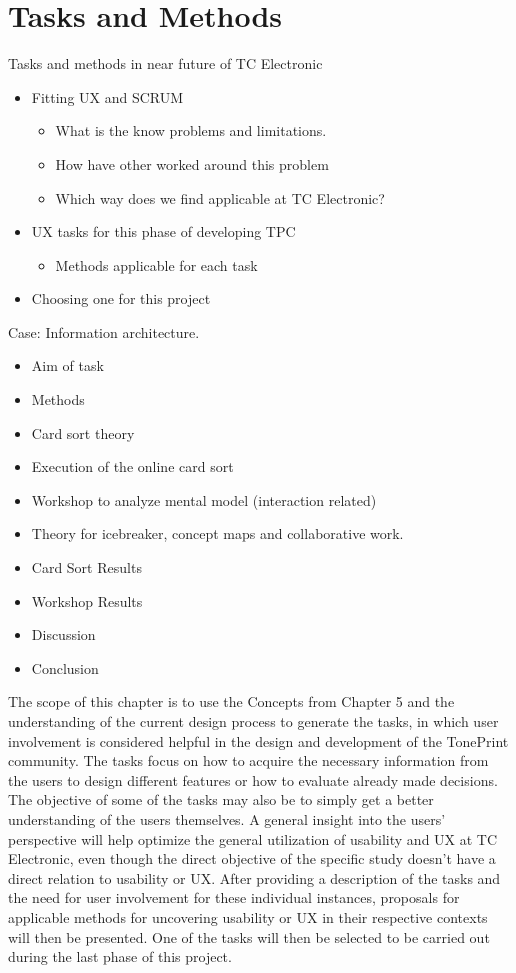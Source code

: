 \chapter{Tasks and Methods}
\label{TaskAndMethods}

Tasks and methods in near future of TC Electronic
\begin{itemize}
	\item Fitting UX and SCRUM
		\begin{itemize}
			\item What is the know problems and limitations.
			\item How have other worked around this problem
			\item Which way does we find applicable at TC Electronic?
		\end{itemize}
	\item UX tasks for this phase of developing TPC
		\begin{itemize}
			\item Methods applicable for each task
		\end{itemize}
	\item Choosing one for this project
\end{itemize}

Case: Information architecture.
\begin{itemize}
	\item Aim of task
	\item Methods
	\item Card sort theory
	\item Execution of the online card sort
	\item Workshop to analyze mental model (interaction related)
	\item Theory for icebreaker, concept maps and collaborative work.
	\item Card Sort Results
	\item Workshop Results
	\item Discussion
	\item Conclusion
\end{itemize}



\noindent
The scope of this chapter is to use the Concepts from Chapter 5 and the understanding of the current design process to generate the tasks, in which user involvement is considered helpful in the design and development of the TonePrint community. The tasks focus on how to acquire the necessary information from the users to design different features or how to evaluate already made decisions. The objective of some of the tasks may also be to simply get a better understanding of the users themselves. A general insight into the users' perspective will help optimize the general utilization of usability and UX at TC Electronic, even though the direct objective of the specific study doesn't have a direct relation to usability or UX. After providing a description of the tasks and the need for user involvement for these individual instances, proposals for applicable methods for uncovering usability or UX in their respective contexts will then be presented. One of the tasks will then be selected to be carried out during the last phase of this project.

